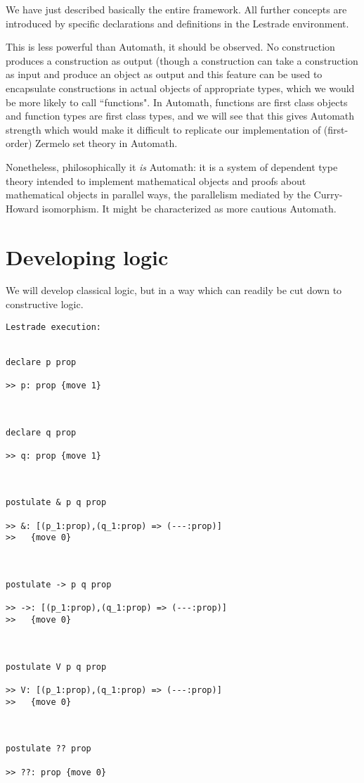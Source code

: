 \documentclass[12pt]{article}
\begin{document}
We have just described basically the entire framework.  All further concepts are introduced by specific declarations and definitions in the Lestrade environment.

This is less powerful than Automath, it should be observed.  No construction produces a construction as output (though a construction can take a construction as input and produce an object as output and this feature can be used to encapsulate constructions in actual objects of appropriate types, which we would be more likely to call ``functions".  In Automath, functions are first class objects and function types are first class types, and we will see that this gives Automath strength which would make it difficult to replicate our implementation of (first-order) Zermelo set theory in Automath.

Nonetheless, philosophically it {\em is\/} Automath:  it is a system of dependent type theory intended to implement mathematical objects and proofs about mathematical objects in parallel ways, the parallelism mediated by the Curry-Howard isomorphism.   It might be characterized as more cautious Automath.



\section{Developing logic}

We will develop classical logic, but in a way which can readily be cut down to constructive logic.

\begin{verbatim}Lestrade execution:


declare p prop

>> p: prop {move 1}



declare q prop

>> q: prop {move 1}



postulate & p q prop

>> &: [(p_1:prop),(q_1:prop) => (---:prop)]
>>   {move 0}



postulate -> p q prop

>> ->: [(p_1:prop),(q_1:prop) => (---:prop)]
>>   {move 0}



postulate V p q prop

>> V: [(p_1:prop),(q_1:prop) => (---:prop)]
>>   {move 0}



postulate ?? prop

>> ??: prop {move 0}


\end{verbatim}
\end{document}
